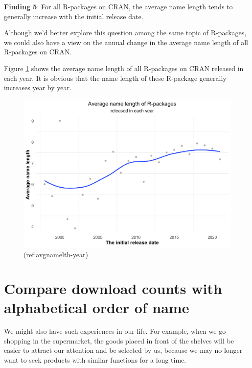 \documentclass[
]{book}
\newenvironment{discovery}[1]{%
  \begin{tcolorbox}[colback=blue!30,colframe=blue!80!black]#1}{\end{tcolorbox}}
\begin{document}
\begin{discovery}
\textbf{Finding 5}: For all R-packages on CRAN, the average name length
tends to generally increase with the initial release date.
\end{discovery}

Although we'd better explore this question among the same topic of R-packages, we could also have a view on the annual change in the average name length of all R-packages on CRAN.

Figure \ref{fig:avgnamelth-year} shows the average name length of all R-packages on CRAN released in each year. It is obvious that the name length of these R-package generally increases year by year.



\begin{figure}

{\centering \includegraphics{figures/avgnamelth-year-1} 

}

\caption{(ref:avgnamelth-year)}\label{fig:avgnamelth-year}
\end{figure}

\hypertarget{compare-download-counts-with-alphabetical-order-of-name}{%
\section{Compare download counts with alphabetical order of name}\label{compare-download-counts-with-alphabetical-order-of-name}}

We might also have such experiences in our life. For example, when we go shopping in the supermarket, the goods placed in front of the shelves will be easier to attract our attention and be selected by us, because we may no longer want to seek products with similar functions for a long time.
\end{document}
